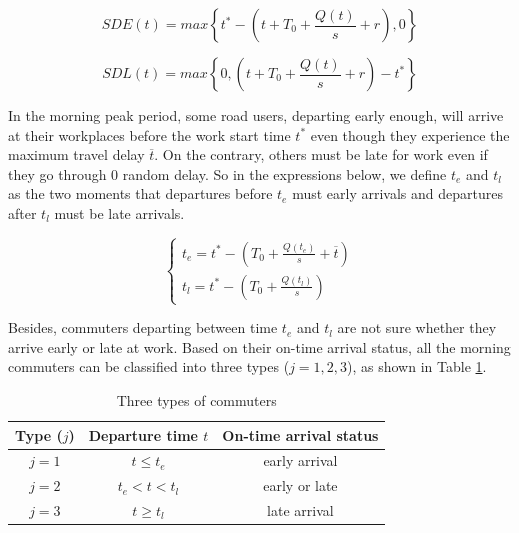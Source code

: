 \documentclass[a4paper,11pt]{article}
\begin{document}
\begin{equation} 
SDE\left(t\right)=max \left\{t^*-\left(t+T_0+\frac{Q(t)}{s}+r\right), 0\right\}
\label{SDE}
\end{equation}

\begin{equation} 
SDL\left(t\right)=max \left\{0, \left(t+T_0+\frac{Q(t)}{s}+r\right)-t^*\right\}
\label{SDL}
\end{equation}

In the morning peak period, some road users, departing early enough, will arrive at their workplaces before the work start time $t^*$ even though they experience the maximum travel delay $\overline{t}$. On the contrary, others must be late for work even if they go through 0 random delay. So in the expressions below, we define $t_e$ and $t_l$ as the two moments that departures before $t_e$ must early arrivals and departures after $t_l$ must be late arrivals.

\begin{equation}
\left\{
\begin{array}{l}
t_e=t^*-\left(T_0+\frac{Q(t_e)}{s}+\overline{t}\right)  \\
t_l=t^*-\left(T_0+\frac{Q(t_l)}{s}\right)
\end{array}
\right.  \label{tetl}
\end{equation}

Besides, commuters departing between time $t_e$ and $t_l$ are not sure whether they arrive early or late at work. Based on their on-time arrival status, all the morning commuters can be classified into three types ($j=1,2,3$), as shown in Table \ref{tab:three type commuters}.

\begin{table}[htbp]
 \caption{Three types of commuters \label{tab:three type commuters}}
 \begin{center}
 \begin{tabular}{ccc}
 
  \toprule
   Type ($j$) & Departure time $t$ & On-time arrival status \\
  \midrule
 $j=1$ & $t \leq t_e$ & early arrival \\
 $j=2$ & $t_e < t < t_l$ & early or late \\
 $j=3$ & $t \geq t_l$ & late arrival \\

  \bottomrule

 \end{tabular}
 \end{center}
\end{table}
\end{document}
